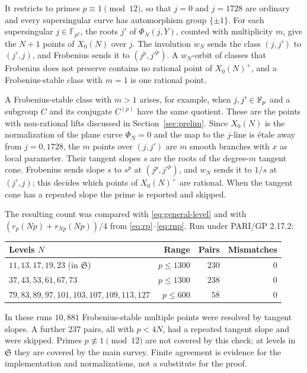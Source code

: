 \documentclass[11pt,a4paper]{article}
\theoremstyle{remark}\newtheorem{remark}[theorem]{Remark}
\numberwithin{equation}{section}
\begin{document}
	It restricts to primes $p\equiv1\pmod{12}$, so that $j=0$ and $j=1728$ are ordinary and every supersingular curve has automorphism group $\{\pm1\}$. For each supersingular $j\in\mathbb F_{p^2}$, the roots $j'$ of $\Phi_N(j,Y)$, counted with multiplicity $m$, give the $N+1$ points of $X_0(N)$ over $j$. The involution $w_N$ sends the class $(j,j')$ to $(j',j)$, and Frobenius sends it to $(j^p,j'^p)$. A $w_N$-orbit of classes that Frobenius does not preserve contains no rational point of $X_0(N)^+$, and a Frobenius-stable class with $m=1$ is one rational point.
	
	A Frobenius-stable class with $m>1$ arises, for example, when $j,j'\in\mathbb F_p$ and a subgroup $C$ and its conjugate $C^{(p)}$ have the same quotient. These are the points with non-rational lifts discussed in Section~\ref{sec:prelim}. Since $X_0(N)$ is the normalization of the plane curve $\Phi_N=0$ and the map to the $j$-line is \'etale away from $j=0,1728$, the $m$ points over $(j,j')$ are $m$ smooth branches with $x$ as local parameter. Their tangent slopes $s$ are the roots of the degree-$m$ tangent cone. Frobenius sends slope $s$ to $s^p$ at $(j^p,j'^p)$, and $w_N$ sends it to $1/s$ at $(j',j)$; this decides which points of $X_0(N)^+$ are rational. When the tangent cone has a repeated slope the prime is reported and skipped.
	
	The resulting count was compared with \eqref{eq:general-level} and with $(r_p(Np)+r_{Np}(Np))/4$ from \eqref{eq:rp}--\eqref{eq:rnp}. Run under PARI/GP 2.17.2:
	\begin{center}
		\begin{tabular}{lrrr}\toprule
			Levels $N$ & Range & Pairs & Mismatches\\\midrule
			$11,13,17,19,23$ (in $\mathfrak S$) & $p\leq1300$ & $230$ & $0$\\
			$37,43,53,61,67,73$ & $p\leq1300$ & $238$ & $0$\\
			$79,83,89,97,101,103,107,109,113,127$ & $p\leq600$ & $58$ & $0$\\\bottomrule
		\end{tabular}
	\end{center}
	In these runs $10{,}881$ Frobenius-stable multiple points were resolved by tangent slopes. A further $237$ pairs, all with $p<4N$, had a repeated tangent slope and were skipped. Primes $p\not\equiv1\pmod{12}$ are not covered by this check; at levels in $\mathfrak S$ they are covered by the main survey. Finite agreement is evidence for the implementation and normalizations, not a substitute for the proof.
	
\end{document}
